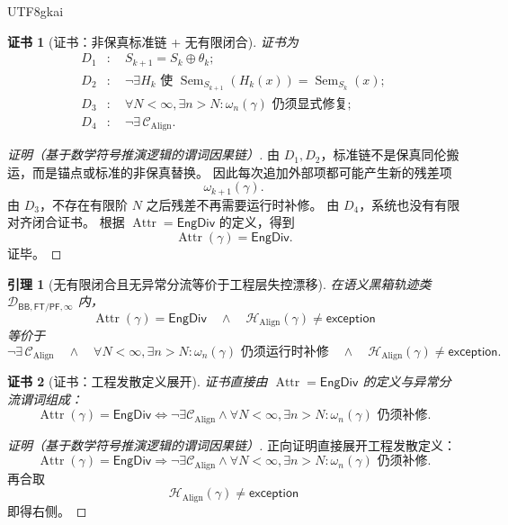 \documentclass[12pt]{article}
\newtheorem{lemma}{引理}[section]
\newtheorem{Certificate}{证书}[section]
\newcommand{\Exc}{\mathsf{exception}}
\newcommand{\FTPF}{\mathsf{FT/PF}}
\newcommand{\BB}{\mathsf{BB}}
\newcommand{\Sem}{\operatorname{Sem}}
\newcommand{\Align}{\operatorname{Align}}
\newcommand{\Attr}{\operatorname{Attr}}
\newcommand{\EngDiv}{\mathsf{EngDiv}}
\begin{document}
\begin{CJK*}{UTF8}{gkai}
\begin{Certificate}[证书：非保真标准链 + 无有限闭合]
\label{cert:tex51-nonfaithful-linfty-engdiv}
证书为
\[
\begin{aligned}
  D_1&:\quad S_{k+1}=S_k\oplus\theta_k;\\
  D_2&:\quad \neg\exists H_k\text{ 使 }\Sem_{S_{k+1}}(H_k(x))=\Sem_{S_k}(x);\\
  D_3&:\quad \forall N<\infty,\exists n>N:\omega_n(\gamma)\text{ 仍须显式修复};\\
  D_4&:\quad \neg\exists\,\mathcal C_{\Align}.
\end{aligned}
\]
\end{Certificate}

\begin{proof}[证明（基于数学符号推演逻辑的谓词因果链）]
由 \(D_1,D_2\)，标准链不是保真同伦搬运，而是锚点或标准的非保真替换。
因此每次追加外部项都可能产生新的残差项
\[
  \omega_{k+1}(\gamma).
\]
由 \(D_3\)，不存在有限阶 \(N\) 之后残差不再需要运行时补修。
由 \(D_4\)，系统也没有有限对齐闭合证书。
根据 \(\Attr=\EngDiv\) 的定义，得到
\[
  \Attr(\gamma)=\EngDiv.
\]
证毕。
\end{proof}

\begin{lemma}[无有限闭合且无异常分流等价于工程层失控漂移]
\label{lem:tex51-no-closure-no-exception-equivalence}
在语义黑箱轨迹类 \(\mathcal D_{\BB,\FTPF,\infty}\) 内，
\[
  \Attr(\gamma)=\EngDiv
  \quad\wedge\quad
  \mathcal H_{\Align}(\gamma)\ne\Exc
\]
等价于
\[
  \neg\exists\,\mathcal C_{\Align}
  \quad\wedge\quad
  \forall N<\infty,\exists n>N:
  \omega_n(\gamma)\text{ 仍须运行时补修}
  \quad\wedge\quad
  \mathcal H_{\Align}(\gamma)\ne\Exc.
\]
\end{lemma}

\begin{Certificate}[证书：工程发散定义展开]
\label{cert:tex51-no-closure-no-exception-equivalence}
证书直接由 \(\Attr=\EngDiv\) 的定义与异常分流谓词组成：
\[
  \Attr(\gamma)=\EngDiv
  \Longleftrightarrow
  \neg\exists\mathcal C_{\Align}
  \wedge
  \forall N<\infty,\exists n>N:\omega_n(\gamma)\text{ 仍须补修}.
\]
\end{Certificate}

\begin{proof}[证明（基于数学符号推演逻辑的谓词因果链）]
正向证明直接展开工程发散定义：
\[
  \Attr(\gamma)=\EngDiv
  \Longrightarrow
  \neg\exists\mathcal C_{\Align}
  \wedge
  \forall N<\infty,\exists n>N:
  \omega_n(\gamma)\text{ 仍须补修}.
\]
再合取
\[
  \mathcal H_{\Align}(\gamma)\ne\Exc
\]
即得右侧。


\end{proof}
\end{CJK*}
\end{document}
